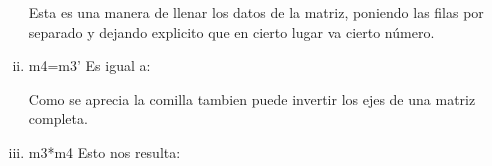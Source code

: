 \documentclass[a4paper]{article}
\begin{document}
\begin{enumerate}[i)]




\vspace{0,5cm}
Esta es una manera de llenar los datos de la matriz, poniendo las filas por separado y dejando explicito que en cierto lugar va cierto número.
\item m4=m3'  Es igual a:





\vspace{0,5cm}
Como se aprecia la comilla tambien puede invertir los ejes de una matriz completa.
\vspace{0,5cm}
\item m3*m4  Esto nos resulta:


\end{enumerate}
\end{document}
